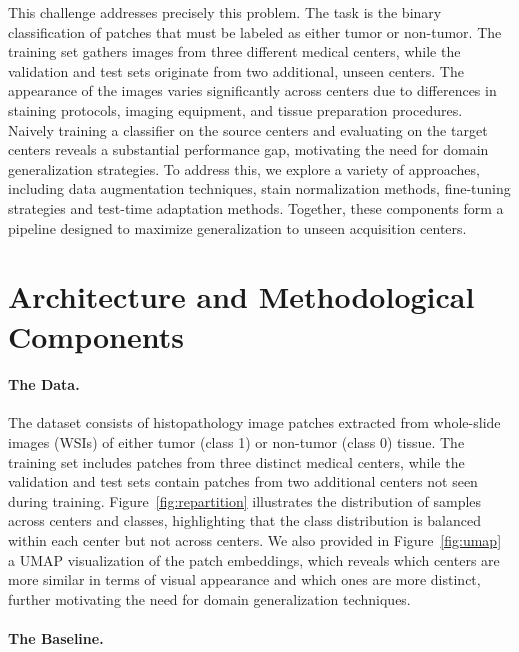 \documentclass{midl}
\begin{document}
This challenge addresses precisely this problem. The task is the binary classification of patches that must be labeled as either tumor or non-tumor. The training set gathers images from three different medical centers, while the validation and test sets originate from two additional, unseen centers. The appearance of the images varies significantly across centers due to differences in staining protocols, imaging equipment, and tissue preparation procedures. 
Naively training a classifier on the source centers and evaluating on the target centers reveals a substantial performance gap, motivating the need for domain generalization strategies. To address this, we explore a variety of approaches, including data augmentation techniques, stain normalization methods, fine-tuning strategies and test-time adaptation methods. Together, these components form a pipeline designed to maximize generalization to unseen acquisition centers.

\section{Architecture and Methodological Components}

\paragraph{The Data.} 

The dataset consists of histopathology image patches extracted from whole-slide images (WSIs) of either tumor (class 1) or non-tumor (class 0) tissue. The training set includes patches from three distinct medical centers, while the validation and test sets contain patches from two additional centers not seen during training. Figure~\ref{fig:repartition} illustrates the distribution of samples across centers and classes, highlighting that the class distribution is balanced within each center but not across centers. We also provided in Figure~\ref{fig:umap} a UMAP visualization of the patch embeddings, which reveals which centers are more similar in terms of visual appearance and which ones are more distinct, further motivating the need for domain generalization techniques.

\paragraph{The Baseline.}
\end{document}
